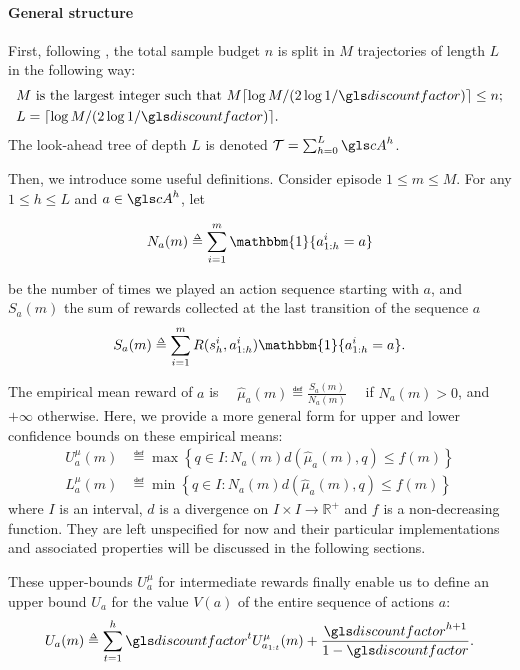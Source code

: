 \paragraph{General structure}

First, following \OLOP, the total sample budget $n$ is split in $M$ trajectories of length $L$ in the following way: 
\begin{align*}
&M\text{ is the largest integer such that } M \ceil{\log M/(2 \log 1/\discount)} \leq n;\\
&L= \ceil{\log M / (2 \log 1/\discount)}.
\end{align*}
The look-ahead tree of depth $L$ is denoted $\Tau = \sum_{h=0}^L \cA^h$.

Then, we introduce some useful definitions. Consider episode $1 \leq m \leq M$. For any $1 \leq h \leq L$ and $a\in \cA^h$, let 


\begin{equation*}
N_a(m) \eqdef \sum_{i=1}^m \mathbbm{1}\{a^i_{1:h} = a\}
\end{equation*}


\noindent
be the number of times we played an action sequence starting with $a$, and $S_a(m)$ the sum of rewards collected at the last transition of the sequence $a$
\begin{equation*}
S_a(m) \eqdef \sum_{i=1}^m R(s_h^i, a^i_{1:h}) \mathbbm{1}\{a^i_{1:h} = a\}.
\end{equation*}

\noindent
The empirical mean reward of $a$ is
$\quad\displaystyle{ \hat{\mu}_a(m) \eqdef \frac{S_a(m)}{N_a(m)}} \quad $
if $N_a(m) > 0$, and $+\infty$ otherwise. Here, we provide a more general form for upper and lower confidence bounds on these empirical means:
\begin{align}
\label{eq:u_mu_a_m}
U^{\mu}_a(m) &\eqdef \max \left\{q\in I: N_a(m) d(\hat{\mu}_a(m), q) \leq f(m) \right\}\\
L^{\mu}_a(m) &\eqdef \min \left\{q\in I: N_a(m) d(\hat{\mu}_a(m), q) \leq f(m) \right\}
\end{align}
where $I$ is an interval, $d$ is a divergence on $I\times I \rightarrow \mathbb{R^+}$ and $f$ is a non-decreasing function. They are left unspecified for now and their particular implementations and associated properties will be discussed in the following sections.

These upper-bounds $U^{\mu}_a$ for intermediate rewards finally enable us to define an upper bound $U_a$ for the value $V(a)$ of the entire sequence of actions $a$:
\begin{equation}
\label{eq:Ua}
U_a(m) \eqdef \sum_{t=1}^h \discount^t U^{\mu}_{a_{1:t}}(m) + \frac{\discount^{h+1}}{1-\discount}.
\end{equation}


